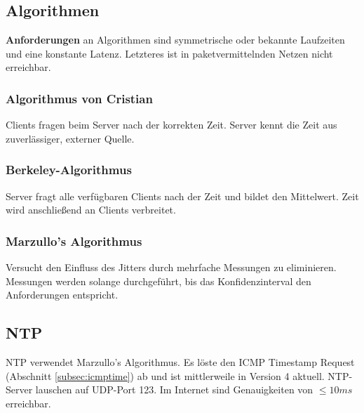 \documentclass{article} %
\begin{document}
\subsection{Algorithmen}
\textbf{Anforderungen} an Algorithmen sind symmetrische oder bekannte Laufzeiten und eine konstante Latenz.
Letzteres ist in paketvermittelnden Netzen nicht erreichbar.
\subsubsection{Algorithmus von Cristian}
Clients fragen beim Server nach der korrekten Zeit.
Server kennt die Zeit aus zuverlässiger, externer Quelle.

\subsubsection{Berkeley-Algorithmus}
Server fragt alle verfügbaren Clients nach der Zeit und bildet den Mittelwert.
Zeit wird anschließend an Clients verbreitet.

\subsubsection{Marzullo's Algorithmus}
Versucht den Einfluss des Jitters durch mehrfache Messungen zu eliminieren.
Messungen werden solange durchgeführt, bis das Konfidenzinterval den Anforderungen entspricht.

\subsection{NTP}
NTP\cite{rfc1305, rfc5905} verwendet Marzullo's Algorithmus.
Es löste den ICMP Timestamp Request (Abschnitt \ref{subsec:icmptime}) ab und ist mittlerweile in Version 4 aktuell.
NTP-Server lauschen auf UDP-Port 123.
Im Internet sind Genauigkeiten von $\leq 10ms$ erreichbar.
\end{document}
